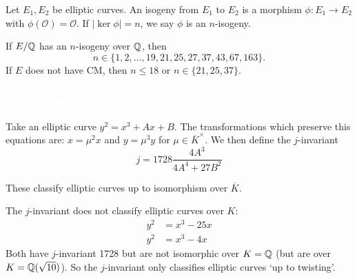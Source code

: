 \begin{frame}[plain]
\end{frame}



\begin{frame}[plain]
	\begin{dfn}[Isogeny]
	Let $E_1,E_2$ be elliptic curves. An isogeny from $E_1$ to $E_2$ is a morphism $\phi: E_1 \to E_2$ with $\phi(\mathcal{O})=\mathcal{O}$. If $|\ker \phi|=n$, we say $\phi$ is an $n$-isogeny. 
	\end{dfn} 

	\begin{thm}
	If $E/\mathbb{Q}$ has an $n$-isogeny over $\mathbb{Q}$, then 
		\[
		n \in \{1,2,\ldots,19,21,25,27,37,43,67,163\}. 
		\]
	If $E$ does not have CM, then $n \leq 18$ or $n \in \{21,25,37\}$. 
	\end{thm}
\end{frame}



\begin{frame}[plain]
\frametitle{\textcolor{white}{$j$-invariant}}

Take an elliptic curve $y^2= x^3 + Ax + B$. The transformations which preserve this equations are: $x= \mu^2 x$ and $y= \mu^3 y$ for $\mu \in \overline{K}^\times$. We then define the $j$-invariant
	\[
	j= 1728 \dfrac{4A^3}{4A^4 + 27B^2}
	\]

These classify elliptic curves up to isomorphism over $\overline{K}$.

\begin{rem}
The $j$-invariant does not classify elliptic curves over $K$:
	\[
	\begin{aligned}
	y^2&= x^3 - 25x \\
	y^2&= x^3 - 4x
	\end{aligned}
	\]
Both have $j$-invariant 1728 but are not isomorphic over $K=\mathbb{Q}$ (but are over $K=\mathbb{Q}(\sqrt{10})$). So the $j$-invariant only classifies elliptic curves `up to twisting'. 
\end{rem}

\end{frame}



